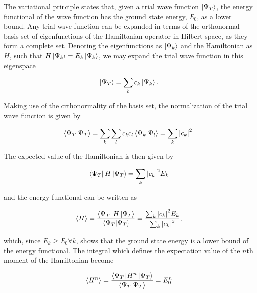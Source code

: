 The variational principle states that, given a trial wave function $\ket{\Psi_T}$, the energy functional of the wave function has the ground state energy, $E_0$, as a lower bound. Any trial wave function can be expanded in terms of the orthonormal basis set of eigenfunctions of the Hamiltonian operator in Hilbert space, as they form a complete set. Denoting the eigenfunctions as $\ket{\Psi_k}$ and the Hamiltonian as $H$, such that $H\ket{\Psi_k}=E_k\ket{\Psi_k}$, we may expand the trial wave function in this eigenspace

\begin{equation*}
    \ket{\Psi_T} = \sum_{k}c_k\ket{\Psi_k}.
\end{equation*}

Making use of the orthonormality of the basis set, the normalization of the trial wave function is given by

\begin{equation*}
    \braket{\Psi_T} = \sum_k\sum_l c_kc_l\braket{\Psi_k}{\Psi_l} = \sum_k \abs{c_k}^2.
\end{equation*}

The expected value of the Hamiltonian is then given by

\begin{equation*}\label{eq:energy_functional_basis_set}
    \bra{\Psi_T}H\ket{\Psi_T} = \sum_k\abs{c_k}^2E_k
\end{equation*}

and the energy functional can be written as 

\begin{equation}\label{eq:variational_expval}
    \expval{H} = \frac{\bra{\Psi_T}H\ket{\Psi_T}}{\braket{\Psi_T}} = \frac{\sum_k\abs{c_k}^2E_k}{\sum_k\abs{c_k}^2}, 
\end{equation}

which, since $E_k\geq E_0 \forall k$, shows that the ground state energy is a lower bound of the energy functional. The integral which defines the expectation value of the $n$th moment of the Hamiltonian become


\begin{equation*}
    \expval{H^n}= \frac{\bra{\Psi_T} H^n \ket{\Psi_T}}{\braket{\Psi_T}} = E_0^n
\end{equation*} 

